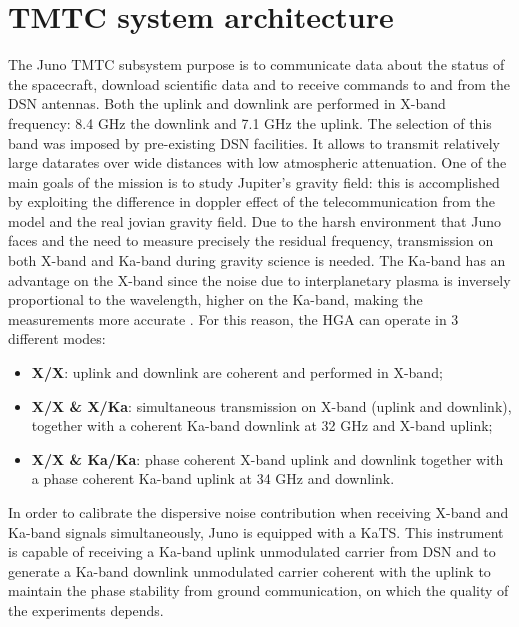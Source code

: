 \section{TMTC system architecture}
\label{sec:TMTC_architecture}


The Juno TMTC subsystem purpose is to communicate data about the status of the spacecraft, download scientific data and to receive commands to and from the DSN antennas. Both the uplink and downlink are performed in X-band frequency: 8.4 GHz the downlink and 7.1 GHz the uplink. The selection of this band was imposed by pre-existing DSN facilities. It allows to transmit relatively large datarates over wide distances with low atmospheric attenuation.
One of the main goals of the mission is to study Jupiter's gravity field: this is accomplished by exploiting the difference in doppler effect of the telecommunication from the model and the real jovian gravity field. Due to the harsh environment that Juno faces and the need to measure precisely the residual frequency, transmission on both X-band and Ka-band during gravity science is needed. The Ka-band has an advantage on the X-band since the noise due to interplanetary plasma is inversely proportional to the wavelength, higher on the Ka-band, making the measurements more accurate \cite{ka_uplink}. 
For this reason, the HGA can operate in 3 different modes: 

\begin{itemize}
\item \textbf{X/X}: uplink and downlink are coherent and performed in X-band;
\item \textbf{X/X \& X/Ka}: simultaneous transmission on X-band (uplink and downlink), together with a coherent Ka-band downlink at 32 GHz and X-band uplink;
\item \textbf{X/X \& Ka/Ka}: phase coherent X-band uplink and downlink together with a phase coherent Ka-band uplink at 34 GHz and downlink.
\end{itemize}

In order to calibrate the dispersive noise contribution when receiving X-band and Ka-band signals simultaneously, Juno is equipped with a KaTS. This instrument is capable of receiving a Ka-band uplink unmodulated carrier from DSN and to generate a Ka-band downlink unmodulated carrier coherent with the uplink to maintain the phase stability from ground communication, on which the quality of the experiments depends\cite{juno_telecommunication}.

